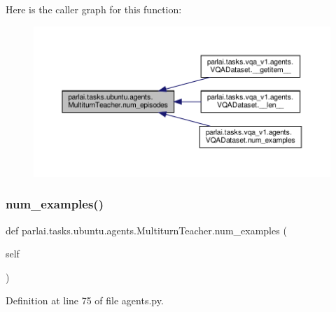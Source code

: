 Here is the caller graph for this function\+:
\nopagebreak
\begin{figure}[H]
\begin{center}
\leavevmode
\includegraphics[width=350pt]{classparlai_1_1tasks_1_1ubuntu_1_1agents_1_1MultiturnTeacher_a420b358909e5dd3dcbf2ec4bb3b3080d_icgraph}
\end{center}
\end{figure}
\mbox{\label{classparlai_1_1tasks_1_1ubuntu_1_1agents_1_1MultiturnTeacher_a0267166445ce66e04d2f71233c12d5dc}} 
\subsubsection{\texorpdfstring{num\+\_\+examples()}{num\_examples()}}
{\footnotesize\ttfamily def parlai.\+tasks.\+ubuntu.\+agents.\+Multiturn\+Teacher.\+num\+\_\+examples (\begin{DoxyParamCaption}\item[{}]{self }\end{DoxyParamCaption})}



Definition at line 75 of file agents.\+py.



